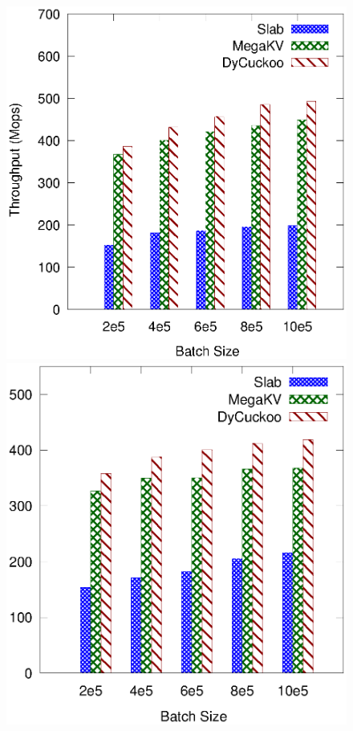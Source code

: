 \begin{figure}[htp]
	\begin{minipage}{0.19\linewidth}\centering
		\includegraphics[width=\linewidth]{pic/dynamic/batch/dynamic_twitter.eps}
		\centerline{\dstwitter}
	\end{minipage}
	\begin{minipage}{0.19\linewidth}\centering
		\includegraphics[width=\linewidth]{pic/dynamic/batch/dynamic_reddit.eps}

\end{minipage}
\end{figure}

